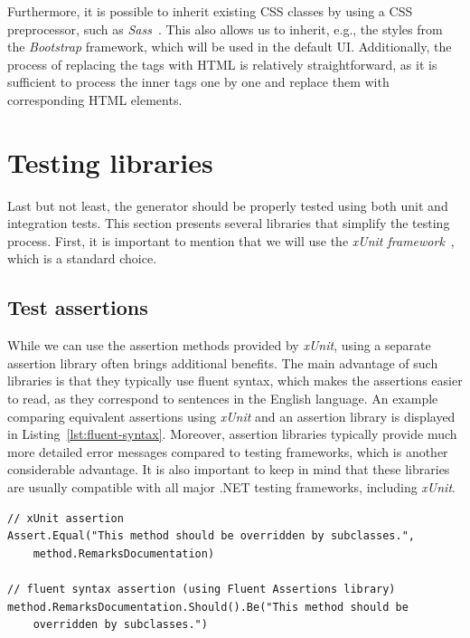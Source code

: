 Furthermore, it is possible to inherit existing CSS classes by using a CSS preprocessor, such as \textit{Sass}~\cite{sass}.
This also allows us to inherit, e.g., the styles from the \textit{Bootstrap} framework, which will be used in the default UI.
Additionally, the process of replacing the tags with HTML is relatively straightforward, as it is sufficient to process the inner tags one by one and replace them with corresponding HTML elements.

\section{Testing libraries}

Last but not least, the generator should be properly tested using both unit and integration tests.
This section presents several libraries that simplify the testing process.
First, it is important to mention that we will use the \textit{xUnit framework}~\cite{xunit}, which is a standard choice.

\subsection*{Test assertions}

While we can use the assertion methods provided by \textit{xUnit}, using a separate assertion library often brings additional benefits.
The main advantage of such libraries is that they typically use fluent syntax, which makes the assertions easier to read, as they correspond to sentences in the English language.
An example comparing equivalent assertions using \textit{xUnit} and an assertion library is displayed in Listing~\ref{lst:fluent-syntax}.
Moreover, assertion libraries typically provide much more detailed error messages compared to testing frameworks, which is another considerable advantage.
It is also important to keep in mind that these libraries are usually compatible with all major .NET testing frameworks, including \textit{xUnit}.

\begin{listing}[H]
\begin{lstlisting}
// xUnit assertion
Assert.Equal("This method should be overridden by subclasses.", 
    method.RemarksDocumentation)

// fluent syntax assertion (using Fluent Assertions library)
method.RemarksDocumentation.Should().Be("This method should be 
    overridden by subclasses.")
\end{lstlisting}
\caption{Comparison of basic and fluent syntax assertions}
\label{lst:fluent-syntax}
\end{listing}

